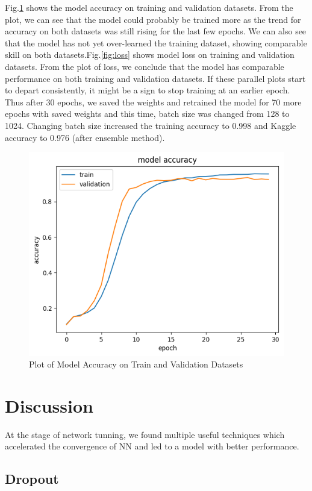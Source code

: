 \documentclass[10pt,conference]{IEEEtran}
\begin{document}
Fig.\ref{fig:acc} shows the model accuracy on training and validation datasets. From the plot, we can see that the model could probably be trained more as the trend for accuracy on both datasets was still rising for the last few epochs. We can also see that the model has not yet over-learned the training dataset, showing comparable skill on both datasets.Fig.\ref{fig:loss} shows model loss on training and validation datasets. From the plot of loss, we conclude that the model has comparable performance on both training and validation datasets. If these parallel plots start to depart consistently, it might be a sign to stop training at an earlier epoch. Thus after 30 epochs, we saved the weights and retrained the model for 70 more epochs with saved weights and this time, batch size was changed from 128 to 1024. Changing batch size increased the training accuracy to 0.998 and Kaggle accuracy to 0.976 (after ensemble method).

\begin{figure}[!tbhp]
\centering
\includegraphics[width = 0.77\linewidth]{acc.png}
\caption{Plot of Model Accuracy on Train and Validation Datasets}
\label{fig:acc}
\end{figure}



\section{Discussion}
At the stage of network tunning, we found multiple useful techniques which accelerated the convergence of NN and led to a model with better performance.
\subsection{Dropout}
\end{document}
